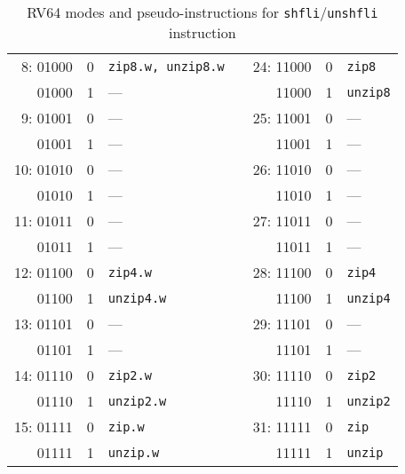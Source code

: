 \begin{table}[h]
\begin{small}
\begin{center}
\begin{tabular}{r c l p{1in} r c l}
\cline{1-3}
\cline{5-7}

 8: 01000 & 0 & {\tt zip8.w, unzip8.w}   &   &   24: 11000 & 0 & {\tt zip8}              \\
    01000 & 1 & ---                      &   &       11000 & 1 & {\tt unzip8}            \\
 9: 01001 & 0 & ---                      &   &   25: 11001 & 0 & ---                     \\
    01001 & 1 & ---                      &   &       11001 & 1 & ---                     \\
10: 01010 & 0 & ---                      &   &   26: 11010 & 0 & ---                     \\
    01010 & 1 & ---                      &   &       11010 & 1 & ---                     \\
11: 01011 & 0 & ---                      &   &   27: 11011 & 0 & ---                     \\
    01011 & 1 & ---                      &   &       11011 & 1 & ---                     \\

\cline{1-3}
\cline{5-7}

12: 01100 & 0 & {\tt zip4.w}             &   &   28: 11100 & 0 & {\tt zip4}              \\
    01100 & 1 & {\tt unzip4.w}           &   &       11100 & 1 & {\tt unzip4}            \\
13: 01101 & 0 & ---                      &   &   29: 11101 & 0 & ---                     \\
    01101 & 1 & ---                      &   &       11101 & 1 & ---                     \\
14: 01110 & 0 & {\tt zip2.w}             &   &   30: 11110 & 0 & {\tt zip2}              \\
    01110 & 1 & {\tt unzip2.w}           &   &       11110 & 1 & {\tt unzip2}            \\
15: 01111 & 0 & {\tt zip.w}              &   &   31: 11111 & 0 & {\tt zip}               \\
    01111 & 1 & {\tt unzip.w}            &   &       11111 & 1 & {\tt unzip}             \\

\end{tabular}
\end{center}
\end{small}
\caption{RV64 modes and pseudo-instructions for {\tt shfli}/{\tt unshfli} instruction}
\label{gzip64-modes}
\end{table}

